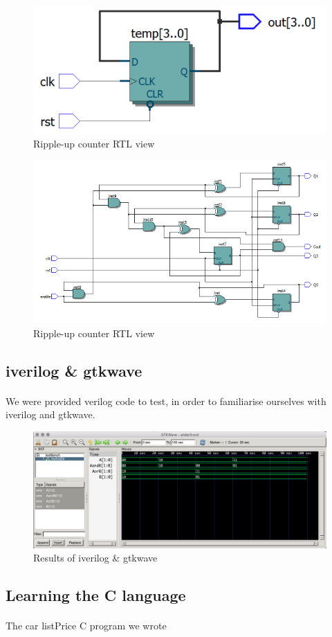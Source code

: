 \documentclass{article}
\begin{document}
	\begin{figure}[H]
	  \centering
	  \includegraphics[width=0.75\linewidth]{figures/RTLs/johnson_RTL.png}
	  \caption{Ripple-up counter RTL view}
	  \label{fig:johnson_RTL}
	\end{figure}

	\begin{figure}[H]
	  \centering
	  \includegraphics[width=0.75\linewidth]{figures/RTLs/schem_synUp_RTL.png}
	  \caption{Ripple-up counter RTL view}
	  \label{fig:schem_synUp_RTL}
	\end{figure}

\subsection{iverilog \& gtkwave}
	\paragraph{} We were provided verilog code to test, in order to familiarise ourselves with iverilog and gtkwave.

	
	
	

	\begin{figure}[H]
	  \centering
	  \includegraphics[width=0.75\linewidth]{figures/iverilog_gtkwave.png}
	  \caption{Results of iverilog \& gtkwave}
	  \label{fig:iverilog_gtkwave}
	\end{figure}

\subsection{Learning the C language}
\paragraph{} The car listPrice C program we wrote

\end{document}
